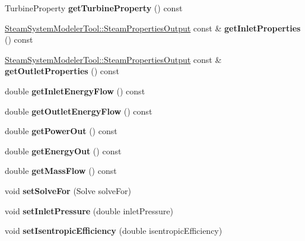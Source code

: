 \begin{DoxyCompactItemize}
Turbine\+Property {\bfseries get\+Turbine\+Property} () const
\item 
\mbox{\label{class_turbine_a7a906cf74affed9acfa4045964eccbf6}} 
\hyperlink{struct_steam_system_modeler_tool_1_1_steam_properties_output}{Steam\+System\+Modeler\+Tool\+::\+Steam\+Properties\+Output} const  \& {\bfseries get\+Inlet\+Properties} () const
\item 
\mbox{\label{class_turbine_aa9449622449e78285a258823ff77c8ec}} 
\hyperlink{struct_steam_system_modeler_tool_1_1_steam_properties_output}{Steam\+System\+Modeler\+Tool\+::\+Steam\+Properties\+Output} const  \& {\bfseries get\+Outlet\+Properties} () const
\item 
\mbox{\label{class_turbine_ae5d55a7b882e4780d490d43409f8f06c}} 
double {\bfseries get\+Inlet\+Energy\+Flow} () const
\item 
\mbox{\label{class_turbine_aa20c0f9dd81cd9bfd5eda77f588516b5}} 
double {\bfseries get\+Outlet\+Energy\+Flow} () const
\item 
\mbox{\label{class_turbine_a89585cc2fbfdbe67d539eae08c369fa2}} 
double {\bfseries get\+Power\+Out} () const
\item 
\mbox{\label{class_turbine_a143fc660274e0d65ccb8fc55cc2caf83}} 
double {\bfseries get\+Energy\+Out} () const
\item 
\mbox{\label{class_turbine_a4893a203dbbf9db9ca77a0b278c4c118}} 
double {\bfseries get\+Mass\+Flow} () const
\item 
\mbox{\label{class_turbine_a96f54a8fc572dae6c5298289de890f4d}} 
void {\bfseries set\+Solve\+For} (Solve solve\+For)
\item 
\mbox{\label{class_turbine_a04996baab9a40d449a69c737c00be8e4}} 
void {\bfseries set\+Inlet\+Pressure} (double inlet\+Pressure)
\item 
\mbox{\label{class_turbine_ae67daa481ef48bcf8aef84bcccb4611d}} 
void {\bfseries set\+Isentropic\+Efficiency} (double isentropic\+Efficiency)
\item 

\end{DoxyCompactItemize}
